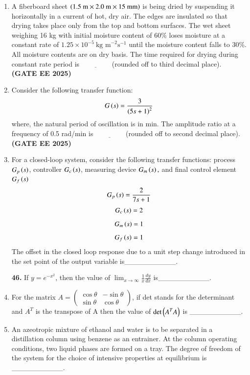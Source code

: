 \documentclass[journal,12pt,onecolumn]{IEEEtran}
\theoremstyle{remark}
\begin{document}
\begin{enumerate}
\item A fiberboard sheet $\left(1.5~\text{m}\times2.0~\text{m}\times15~\text{mm}\right)$ is being dried by suspending it horizontally in a current of hot, dry air. The edges are insulated so that drying takes place only from the top and bottom surfaces. The wet sheet weighing 16 kg with initial moisture content of 60\% loses moisture at a constant rate of $1.25\times10^{-5}~\text{kg m}^{-2}\text{s}^{-1}$ until the moisture content falls to 30\%. All moisture contents are on dry basis. The time required for drying during constant rate period  is$\underline{\hspace{2cm}}$(rounded off to third decimal place). \hfill \textbf{(GATE EE 2025)} 



\item Consider the following transfer function:
\[ G\left(s\right)=\frac{3}{\left(5s+1\right)^{2}} \]
where, the natural period of oscillation is in min. The amplitude ratio at a frequency of 0.5 rad/min is$\underline{\hspace{2cm}}$(rounded off to second decimal place). \hfill \textbf{(GATE EE 2025)} 



\item For a closed-loop system, consider the following transfer functions:
process $G_{p}\left(s\right)$, controller $G_{c}\left(s\right)$, measuring device $G_{m}\left(s\right),$ and final control element $G_{f}\left(s\right)$
\[ G_{p}\left(s\right) = \frac{2}{7s+1} \]
\[ G_{c}\left(s\right)=2 \]
\[ G_{m}\left(s\right)=1 \]
\[ G_{f}\left(s\right)=1 \]
The offset in the closed loop response due to a unit step change introduced in the set point of the output variable is\_\_\_\_\_\_\_\_\_\_.




\noindent\textbf{46.} If $y=e^{-x^{2}}$, then the value of $\lim_{x\rightarrow\infty}\frac{1}{x}\frac{dy}{dx}$ is\_\_\_\_\_\_\_\_\_\_.



\item For the matrix $A = \begin{pmatrix} \cos\theta & -\sin\theta \\ \sin\theta & \cos\theta \end{pmatrix}$, if det stands for the determinant and $A^{T}$ is the transpose of A then the value of $\det\left(A^{T}A\right)$ is \_\_\_\_\_\_\_\_\_\_.



\item An azeotropic mixture of ethanol and water is to be separated in a distillation column using benzene as an entrainer. At the column operating conditions, two liquid phases are formed on a tray. The degree of freedom of the system for the choice of intensive properties at equilibrium is \_\_\_\_\_\_\_\_\_\_.





\end{enumerate}
\end{document}
